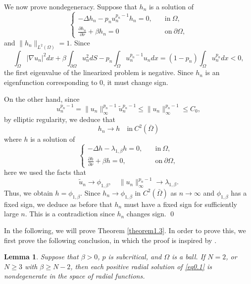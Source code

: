 \documentclass[12pt,reqno]{amsart}
\numberwithin{equation}{section}
\newtheorem{lemma}[theorem]{Lemma}
\theoremstyle{definition}
\begin{document}
We now prove nondegeneracy. Suppose that $h_n$ is a solution of 
 \begin{equation}
\begin{cases}
-\Delta h_n-p_nu_n^{p_n-1}h_n=0, \quad &\text{in}\ \Omega,\\
\frac{\partial h_n}{\partial \nu}+\beta h_n=0 &\text{on}\ \partial\Omega,
\end{cases}
\end{equation}
and $\|h_n\|_{L^2(\Omega)}=1$.  
Since 
$$
\int_{\Omega}|\nabla u_n|^2dx+\beta\int_{\partial\Omega}u_n^2dS-p_n\int_{\Omega}u_n^{p_n-1}u_ndx=(1-p_n)\int_{\Omega}u_n^{p_n}dx<0,
$$
the first eigenvalue of the linearized problem is negative. Since $h_n$ is an eigenfunction corresponding to $0$, it must change sign.

On the other hand, since 
$$
u_n^{p_n-1}=\|u_n\|_\infty^{p_n-1}\tilde{u}_n^{p_n-1}\le \|u_n\|_\infty^{p_n-1}\le C_0,
$$
by elliptic regularity, we deduce that 
$$
h_n\to h \quad \text{in}\ C^2(\bar{\Omega})
$$
where $h$ is a solution of 
\begin{equation}
\begin{cases}
-\Delta h-\lambda_{1,\beta}h=0,\quad &\text{in}\ \Omega,\\
\frac{\partial h}{\partial \nu}+\beta h=0, &\text{on}\ \partial\Omega,
\end{cases}
\end{equation}
here we used the facts that 
$$
\tilde{u}_n\to \phi_{1,\beta},\quad \|u_n\|_\infty^{p_n-1}\to \lambda_{1,\beta}.
$$
Thus, we obtain $h=\phi_{1,\beta}$. Since $h_n \to \phi_{1,\beta}$ in $C^2(\bar{\Omega})$ as $n \to \infty$ and $\phi_{1,\beta}$ has a fixed sign, we deduce as before that $h_n$ must have a fixed sign for sufficiently large $n$. This is a contradiction since $h_n$ changes sign.
\qed


In the following, we will prove Theorem \ref{theorem1.3}. In order to prove this, we first prove the following conclusion, in which the proof is inspired by  \cite{DGP,L}.

\begin{lemma}\label{lemma3.1}
Suppose that $\beta>0$, $p$ is subcritical, and $\Omega$ is a ball. If $N=2$, or $N\ge 3$ with $\beta\ge N-2$, then each positive radial solution of \eqref{eq0.1} is nondegenerate in the space of radial functions.
\end{lemma}
\end{document}
